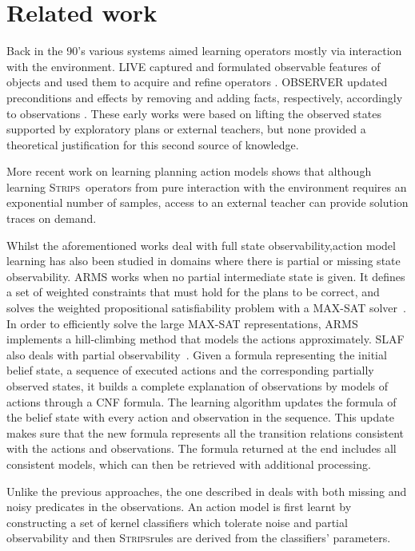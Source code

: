 \documentclass[3p,times]{elsarticle}
\newcommand{\strips}{\textsc{Strips}}     %
\begin{document}
\section{Related work}
\label{sec:Section2}
Back in the 90's various systems aimed learning operators mostly via interaction with the environment. {\sc LIVE} captured and formulated observable features of objects and used them to acquire and refine operators \cite{ShenS89}. {\sc OBSERVER} updated preconditions and effects by removing and adding facts, respectively, accordingly to observations \cite{Wang95learningby}. These early works were based on lifting the observed states supported by exploratory plans or external teachers, but none provided a theoretical justification for this second source of knowledge.

More recent work on learning planning action models \cite{WalshL08} shows that although learning \strips\ operators from pure interaction with the environment requires an exponential number of samples, access to an external teacher can provide solution traces on demand.

Whilst the aforementioned works deal with full state observability,action model learning has also been studied in domains where there is partial or missing state observability. {\sf ARMS} works when no partial intermediate state is given. It defines a set of weighted constraints that must hold for the plans to be correct, and solves the weighted propositional satisfiability problem with a MAX-SAT solver~\cite{yang2007learning}. In order to efficiently solve the large MAX-SAT representations, {\sf ARMS} implements a hill-climbing method that models the actions approximately. %
{\sc SLAF} also deals with partial observability~\cite{amir:alearning:JAIR08}. Given a formula representing the initial belief state, a sequence of executed actions and the corresponding partially observed states, it builds a complete explanation of observations by models of actions through a CNF formula. The learning algorithm updates the formula of the belief state with every action and observation in the sequence. This update makes sure that the new formula represents all the transition relations consistent with the actions and observations. The formula returned at the end includes all consistent models, which can then be retrieved with additional processing.

Unlike the previous approaches, the one described in \cite{MouraoZPS12} deals with both missing and noisy predicates in the observations. An action model is first learnt by constructing a set of kernel classifiers which tolerate noise and partial observability and then \strips rules are derived from the classifiers' parameters.
\end{document}
